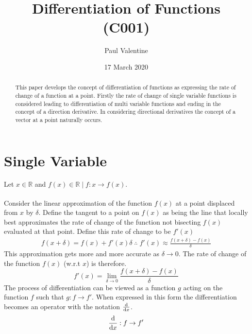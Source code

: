 \documentclass[a4paper]{article}
\title{\textbf{Differentiation of Functions}\\(C001)}
\author{Paul Valentine}
\date{17 March 2020}
\begin{document}
\maketitle
\begin{abstract}
This paper develops the concept of differentiation of functions as expressing the rate of change of a function at a point. Firstly the rate of change of single variable functions is considered leading to differentiation of multi variable functions and ending in the concept of a direction derivative. In considering directional derivatives the concept of a vector at a point naturally occurs. 
\end{abstract}
\section{Single Variable}
Let $x\in\mathbb{R}$ and $f(x)\in \mathbb{R} \mid f:x \to f(x)$.\\ \\
Consider the linear approximation of the function $f(x)$ at a point displaced from $x$ by $\delta$. Define the tangent to a point on $f(x)$ as being the line that locally best approximates the rate of change of the function not bisecting $f(x)$ evaluated at that point. Define this rate of change to be $f'(x)$
\begin{align}
f(x+\delta)= f(x) + f'(x)\delta \; \therefore \; f'(x) \approx \frac{f(x+\delta)-f(x)}{\delta} \label{eq1}
\end{align}
This approximation gets more and more accurate as $\delta \to 0$. The rate of change of the function $f(x)$ (w.r.t $x$) is therefore.
\begin{equation}
f'(x)=\displaystyle{\lim_{\delta \to 0}} \frac{f(x+\delta)-f(x)}{\delta}
\end{equation}
The process of differentiation can be viewed as a function $g$ acting on the function $f$ such that $g:f \to f'$. When expressed in this form the differentiation becomes an operator with the notation $\dv{}{x}$.
\begin{equation}
\dv{}{x} :f\to f'
\end{equation}
\end{document}
